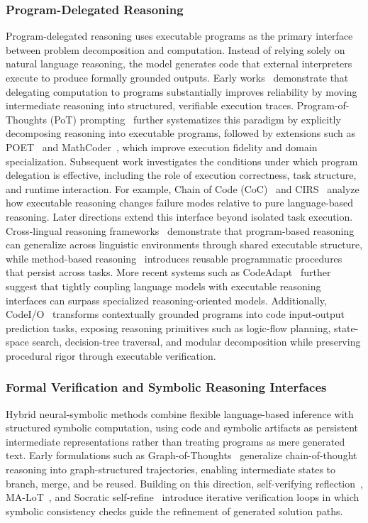 \subsubsection{Program-Delegated Reasoning}
Program-delegated reasoning uses executable programs as the
primary interface between problem decomposition and computation.
Instead of relying solely on natural language reasoning, the
model generates code that external interpreters execute to
produce formally grounded outputs.
Early works~\cite{nye2021show,gao2023pal} demonstrate that
delegating computation to programs substantially improves
reliability by moving intermediate reasoning into structured,
verifiable execution traces.
Program-of-Thoughts (PoT) prompting~\cite{chen2022program}
further systematizes this paradigm by explicitly decomposing
reasoning into executable programs, followed by extensions such
as POET~\cite{pi2022reasoning} and
MathCoder~\cite{wang2023mathcoder}, which improve execution
fidelity and domain specialization.
Subsequent work investigates the conditions under which program
delegation is effective, including the role of execution
correctness, task structure, and runtime interaction.
For example, Chain of Code (CoC)~\cite{li2023chain} and
CIRS~\cite{bi2024program} analyze how executable reasoning
changes failure modes relative to pure language-based reasoning.
Later directions extend this interface beyond isolated task
execution. Cross-lingual reasoning
frameworks~\cite{payoungkhamdee2025towards} demonstrate that
program-based reasoning can generalize across linguistic
environments through shared executable structure, while
method-based reasoning~\cite{su2025method} introduces reusable
programmatic procedures that persist across tasks.
More recent systems such as
CodeAdapt~\cite{zhang2025code} further suggest that tightly
coupling language models with executable reasoning interfaces can surpass specialized reasoning-oriented models. Additionally, CodeI/O~\cite{pmlr-v267-li25t} transforms contextually grounded programs into code input-output prediction tasks, exposing reasoning primitives such as logic-flow planning, state-space search, decision-tree traversal, and modular decomposition while preserving procedural rigor through executable verification.

\subsubsection{Formal Verification and Symbolic Reasoning Interfaces}

Hybrid neural-symbolic methods combine flexible language-based inference with structured symbolic computation, using code and symbolic artifacts as persistent intermediate representations rather than treating programs as mere generated text. Early formulations such as Graph-of-Thoughts~\cite{besta2024graph} generalize chain-of-thought reasoning into graph-structured trajectories, enabling intermediate states to branch, merge, and be reused. Building on this direction, self-verifying reflection~\cite{yu2025self}, MA-LoT~\cite{wang2025ma}, and Socratic self-refine~\cite{shi2025ssr} introduce iterative verification loops in which symbolic consistency checks guide the refinement of generated solution paths.


